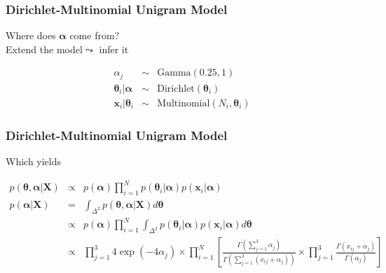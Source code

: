 \documentclass{beamer}
\numberwithin{equation}{section}
\begin{document}
\begin{frame}
\frametitle{Dirichlet-Multinomial Unigram Model}

Where does $\boldsymbol{\alpha}$ come from?\\
Extend the model$\leadsto$ \alert{infer} it

\begin{eqnarray}
\alpha_{j} & \sim & \text{Gamma}(0.25, 1) \nonumber \\
\boldsymbol{\theta}_{i}|\boldsymbol{\alpha} & \sim & \text{Dirichlet}(\boldsymbol{\theta}_{i}) \nonumber \\
\boldsymbol{x}_{i}| \boldsymbol{\theta}_{i} & \sim & \text{Multinomial}(N_{i}, \boldsymbol{\theta}_{i} ) \nonumber 
\end{eqnarray}



\end{frame}

\begin{frame}
\frametitle{Dirichlet-Multinomial Unigram Model}

Which yields
\begin{footnotesize}
\begin{eqnarray}
p(\boldsymbol{\theta}, \boldsymbol{\alpha} | \boldsymbol{X}) & \propto &  p(\boldsymbol{\alpha}) \prod_{i=1}^{N} p(\boldsymbol{\theta}_{i} | \boldsymbol{\alpha}) p(\boldsymbol{x}_{i} | \boldsymbol{\alpha})  \nonumber \\
p(\boldsymbol{\alpha}|\boldsymbol{X}) & = & \int_{\Delta^{2}} p(\boldsymbol{\theta}, \boldsymbol{\alpha} | \boldsymbol{X})  d\boldsymbol{\theta}  \nonumber \\
& \propto & 
p(\boldsymbol{\alpha}) \prod_{i=1}^{N} \int_{\Delta^{2}} p(\boldsymbol{\theta}_{i} | \boldsymbol{\alpha}) p(\boldsymbol{x}_{i} | \boldsymbol{\alpha})d\boldsymbol{\theta} \nonumber \\
& \propto & \prod_{j=1}^{3} 4 \exp\left( - 4 \alpha_{j}  \right)  \times \prod_{i=1}^{N}\left[\frac{\Gamma(\sum_{j=1}^{3} \alpha_{j} )}{\Gamma(\sum_{j=1}^{3} (x_{ij} + \alpha_{j} ))}\times \prod_{j=1}^{3} \frac{\Gamma(x_{ij} + \alpha_{j}) }{\Gamma(\alpha_{j} )   }\right] \nonumber 
\end{eqnarray}
\end{footnotesize}




\end{frame}
\end{document}
